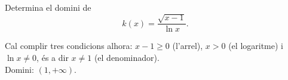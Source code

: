 \begin{apartats}
\begin{nomesllarg}
Determina el domini de
\[
k(x)=\frac{\sqrt{x-1}}{\ln x} .
\]

\begin{solucio}
Cal complir tres condicions alhora: $x-1\ge0$ (l'arrel), $x>0$ (el logaritme) i $\ln x\neq0$, és a dir
$x\neq1$ (el denominador).\\
Domini: $(1,+\infty)$.
\end{solucio}
\end{nomesllarg}

\end{apartats}
